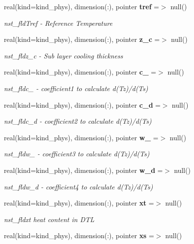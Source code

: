 \begin{DoxyCompactItemize}
real(kind=kind\+\_\+phys), dimension(\+:), pointer \textbf{ tref} =$>$ null()
\begin{DoxyCompactList}\small\item\em nst\+\_\+fldTref -\/ Reference Temperature \end{DoxyCompactList}\item 
real(kind=kind\+\_\+phys), dimension(\+:), pointer \textbf{ z\+\_\+c} =$>$ null()
\begin{DoxyCompactList}\small\item\em nst\+\_\+fldz\+\_\+c -\/ Sub layer cooling thickness \end{DoxyCompactList}\item 
real(kind=kind\+\_\+phys), dimension(\+:), pointer \textbf{ c\+\_} =$>$ null()
\begin{DoxyCompactList}\small\item\em nst\+\_\+fldc\+\_ -\/ coefficient1 to calculate d(\+Tz)/d(Ts) \end{DoxyCompactList}\item 
real(kind=kind\+\_\+phys), dimension(\+:), pointer \textbf{ c\+\_\+d} =$>$ null()
\begin{DoxyCompactList}\small\item\em nst\+\_\+fldc\+\_\+d -\/ coefficient2 to calculate d(\+Tz)/d(Ts) \end{DoxyCompactList}\item 
real(kind=kind\+\_\+phys), dimension(\+:), pointer \textbf{ w\+\_} =$>$ null()
\begin{DoxyCompactList}\small\item\em nst\+\_\+fldw\+\_ -\/ coefficient3 to calculate d(\+Tz)/d(Ts) \end{DoxyCompactList}\item 
real(kind=kind\+\_\+phys), dimension(\+:), pointer \textbf{ w\+\_\+d} =$>$ null()
\begin{DoxyCompactList}\small\item\em nst\+\_\+fldw\+\_\+d -\/ coefficient4 to calculate d(\+Tz)/d(Ts) \end{DoxyCompactList}\item 
real(kind=kind\+\_\+phys), dimension(\+:), pointer \textbf{ xt} =$>$ null()
\begin{DoxyCompactList}\small\item\em nst\+\_\+fldxt heat content in D\+TL \end{DoxyCompactList}\item 
real(kind=kind\+\_\+phys), dimension(\+:), pointer \textbf{ xs} =$>$ null()

\end{DoxyCompactItemize}
